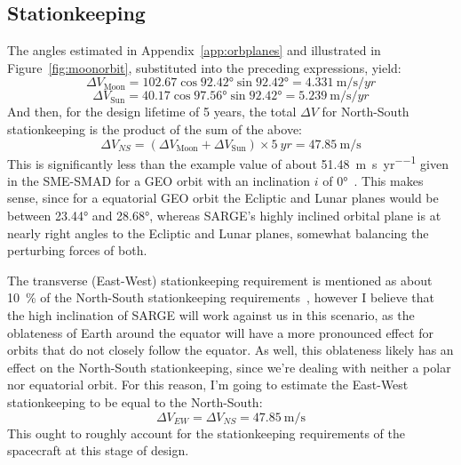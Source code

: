\documentclass[9pt]{article}
\begin{document}
\subsection{Stationkeeping}\label{app:stnkeep}
The angles estimated in Appendix~\ref{app:orbplanes} and illustrated in Figure~\ref{fig:moonorbit}, substituted into the preceding expressions, yield:
\begin{equation}
  {\Delta V}_\text{Moon} = 102.67\cos{\ang{92.42}}\sin{\ang{92.42}} = \qty{4.331}{\meter\per\second\per yr}
\end{equation}
\begin{equation}
  {\Delta V}_\text{Sun} = 40.17\cos{\ang{97.56}}\sin{\ang{92.42}} = \qty{5.239}{\meter\per\second\per yr}  
\end{equation}
And then, for the design lifetime of 5 years, the total $\Delta V$ for North-South stationkeeping is the product of the sum of the above:
\begin{equation}
  {\Delta V}_{NS} = ({\Delta V}_\text{Moon} + {\Delta V}_\text{Sun}) \times \qty{5}{yr} = \qty{47.85}{\meter\per\second}
\end{equation}
This is significantly less than the example value of about \qty{51.48}{\meter\per\second\per yr} given in the SME-SMAD for a GEO orbit with an inclination $i$ of \ang{0}~\cite{sme}.
This makes sense, since for a equatorial GEO orbit the Ecliptic and Lunar planes would be between \ang{23.44} and \ang{28.68}, whereas SARGE's highly inclined orbital plane is at nearly right angles to the Ecliptic and Lunar planes, somewhat balancing the perturbing forces of both.

The transverse (East-West) stationkeeping requirement is mentioned as about \qty{10}{\percent} of the North-South stationkeeping requirements~\cite{sme}, however I believe that the high inclination of SARGE will work against us in this scenario, as the oblateness of Earth around the equator will have a more pronounced effect for orbits that do not closely follow the equator.
As well, this oblateness likely has an effect on the North-South stationkeeping, since we're dealing with neither a polar nor equatorial orbit.
For this reason, I'm going to estimate the East-West stationkeeping to be equal to the North-South:
\begin{equation}
  {\Delta V}_{EW} = {\Delta V}_{NS} = \qty{47.85}{\meter\per\second}%
\end{equation}
This ought to roughly account for the stationkeeping requirements of the spacecraft at this stage of design. 
\end{document}
